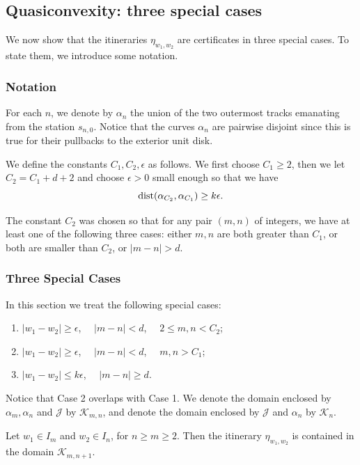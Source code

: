 \subsection{Quasiconvexity: three special cases}

We now show that the itineraries $\eta_{w_1,w_2}$ are certificates in three special cases. To state them, we introduce some notation.

\subsubsection{Notation}
For each $n$, we denote by  $\alpha_n$ the union of the two outermost tracks emanating from the station $s_{n,0}$. 
Notice that the curves $\alpha_n$ are pairwise disjoint since this is true for their pullbacks to the exterior unit disk.

We define the constants $C_1, C_2, \epsilon$ as follows. We first choose $C_1 \ge 2$, then we let $C_2 = C_1 + d+2$ and choose $\epsilon >0$ small enough so that we have 
\begin{equation}
	\operatorname{dist}(\alpha_{C_2}, \alpha_{C_1}) \geq k \epsilon.
\end{equation}

The constant $C_2$ was chosen so that for any pair $(m,n)$ of integers, we have at least one of the following three cases: either $m,n$ are both greater than $C_1$, or both are smaller than $C_2$, or $|m-n| > d$.

\subsubsection{Three Special Cases}
In this section we treat the following special cases:
\begin{enumerate}
	\item $|w_1-w_2| \geq  \epsilon$, $\quad |m-n|<d$, $\quad 2 \le m,n < C_2$; %
	\item $|w_1-w_2| \geq \epsilon$, $\quad |m-n|<d$, $\quad  m,n> C_1$; %
	\item $|w_1-w_2| \leq k \epsilon$, $\quad |m-n| \geq d$.
\end{enumerate}

Notice that Case 2 overlaps with Case 1.
 We denote the domain enclosed by $\alpha_m, \alpha_n$ and $\mathcal J$ by $\mathcal K_{m,n}$, and denote the domain enclosed by $\mathcal J$ and $\alpha_n$ by $\mathcal K_n$.

\begin{lemma}
Let $w_1 \in I_m$ and $w_2 \in I_n$, for $n \geq m \geq 2$. Then the itinerary $\eta_{w_1,w_2}$ is contained in the domain $\mathcal K_{m,n+1}$.
\end{lemma}

